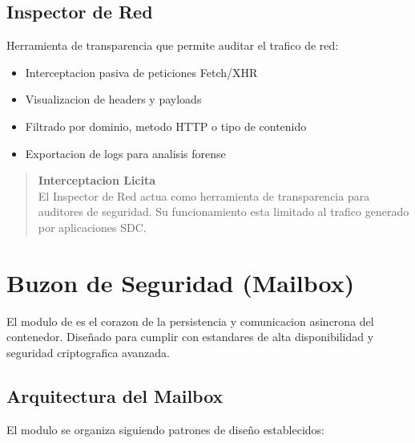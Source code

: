\subsection{Inspector de Red}

Herramienta de transparencia que permite auditar el trafico de red:

\begin{itemize}[leftmargin=*]
    \item Interceptacion pasiva de peticiones Fetch/XHR
    \item Visualizacion de headers y payloads
    \item Filtrado por dominio, metodo HTTP o tipo de contenido
    \item Exportacion de logs para analisis forense
\end{itemize}

\begin{quote}
\textbf{Interceptacion Licita}\\
El Inspector de Red actua como herramienta de transparencia para auditores de seguridad. Su funcionamiento esta limitado al trafico generado por aplicaciones SDC.
\end{quote}

\section{Buzon de Seguridad (Mailbox)}
\label{sec:mailbox}

El modulo de  es el corazon de la persistencia y comunicacion asincrona del contenedor. Diseñado para cumplir con estandares de alta disponibilidad y seguridad criptografica avanzada.


\subsection{Arquitectura del Mailbox}

El modulo se organiza siguiendo patrones de diseño establecidos:

